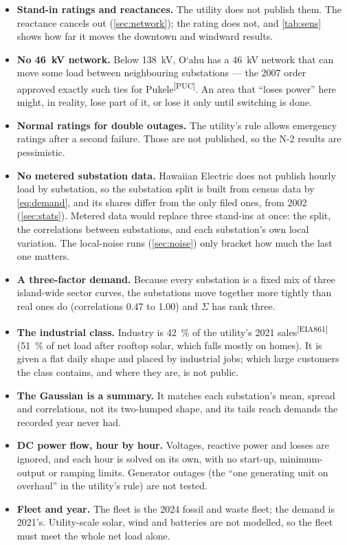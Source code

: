 \documentclass[11pt,a4paper]{article}
\newcommand{\okina}{\textquoteleft}
\newcommand{\Oahu}{O\okina ahu}
\newcommand{\src}[1]{\textsuperscript{[#1]}}
\begin{document}
\begin{itemize}
  \item \textbf{Stand-in ratings and reactances.} The utility does not publish them.
        The reactance cancels out (\cref{sec:network}); the rating does not, and
        \cref{tab:sens} shows how far it moves the downtown and windward results.
  \item \textbf{No \SI{46}{kV} network.} Below \SI{138}{kV}, \Oahu{} has a
        \SI{46}{kV} network that can move some load between neighbouring substations ---
        the 2007 order approved exactly such ties for Pukele\src{PUC}. An area that
        ``loses power'' here might, in reality, lose part of it, or lose it only until
        switching is done.
  \item \textbf{Normal ratings for double outages.} The utility's rule allows emergency
        ratings after a second failure. Those are not published, so the N-2 results are
        pessimistic.
  \item \textbf{No metered substation data.} Hawaiian Electric does not publish hourly
        load by substation, so the substation split is built from census data by
        \cref{eq:demand}, and its shares differ from the only filed ones, from 2002
        (\cref{sec:stats}). Metered data would replace three stand-ins at once: the
        split, the correlations between substations, and each substation's own local
        variation. The local-noise runs (\cref{sec:noise}) only bracket how much the
        last one matters.
  \item \textbf{A three-factor demand.} Because every substation is a fixed mix of three
        island-wide sector curves, the substations move together more tightly than real
        ones do (correlations 0.47 to 1.00) and $\Sigma$ has rank three.
  \item \textbf{The industrial class.} Industry is \SI{42}{\percent} of the utility's 2021
        sales\src{EIA861} (\SI{51}{\percent} of net load after rooftop solar, which falls
        mostly on homes). It is given a flat daily shape and placed by industrial jobs;
        which large customers the class contains, and where they are, is not public.
  \item \textbf{The Gaussian is a summary.} It matches each substation's mean, spread and
        correlations, not its two-humped shape, and its tails reach demands the recorded
        year never had.
  \item \textbf{DC power flow, hour by hour.} Voltages, reactive power and losses are
        ignored, and each hour is solved on its own, with no start-up, minimum-output or
        ramping limits. Generator outages (the ``one generating unit on overhaul'' in
        the utility's rule) are not tested.
  \item \textbf{Fleet and year.} The fleet is the 2024 fossil and waste fleet; the demand
        is 2021's. Utility-scale solar, wind and batteries are not modelled, so the
        fleet must meet the whole net load alone.
\end{itemize}
\end{document}
